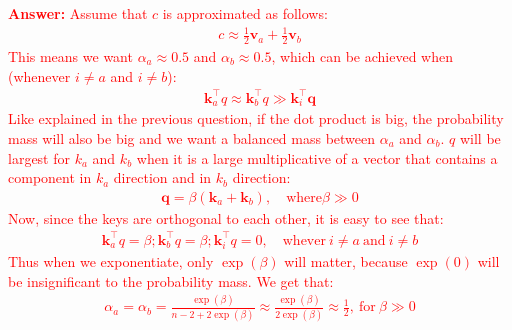 \documentclass[letterpaper,12pt]{article}
\begin{document}
\begin{itemize}
	\textcolor{red}{\textbf{Answer:} Assume that $c$ is approximated as follows:
	\begin{equation*}
		\begin{aligned}
			c \approx \frac{1}{2}\mathbf{v}_a + \frac{1}{2}\mathbf{v}_b
		\end{aligned}
	\end{equation*}
	This means we want $\alpha_a \approx 0.5$ and $\alpha_b \approx 0.5$, which can be achieved when (whenever $i \neq a$ and $i \neq b$):
	\begin{equation*}
		\begin{aligned}
			\mathbf{k}_a^\top q \approx \mathbf{k}_b^\top q \gg \mathbf{k}_i^\top \mathbf{q}
		\end{aligned}
	\end{equation*}
	Like explained in the previous question, if the dot product is big, the probability mass will also be big and we want a balanced mass between $\alpha_a$ and $\alpha_b$. $q$ will be largest for $k_a$ and $k_b$ when it is a large multiplicative of a vector that contains a component in $k_a$ direction and in $k_b$ direction:
	\begin{equation*}
		\begin{aligned}
			\mathbf{q} = \beta (\mathbf{k}_a + \mathbf{k}_b), \quad \text{where} \beta \gg 0
		\end{aligned}
	\end{equation*}
	Now, since the keys are orthogonal to each other, it is easy to see that:
	\begin{equation*}
		\begin{aligned}
			\mathbf{k}_a^\top q = \beta; \mathbf{k}_b^\top q = \beta; \mathbf{k}_i^\top q = 0, \quad \text{whever} \ i\neq a \ \text{and} \ i\neq b
		\end{aligned}
	\end{equation*}
	Thus when we exponentiate, only $\exp(\beta)$ will matter, because $\exp(0)$ will be insignificant to the probability mass. We get that:
	\begin{equation*}
		\begin{aligned}
			\alpha_a=\alpha_b=\frac{\exp(\beta)}{n-2+2\exp(\beta)} \approx \frac{\exp(\beta)}{2\exp(\beta)} \approx \frac{1}{2}, \ \text{for} \ \beta \gg 0
		\end{aligned}
	\end{equation*}
	}
	
	\end{itemize}	
	
	
	
\end{document}
